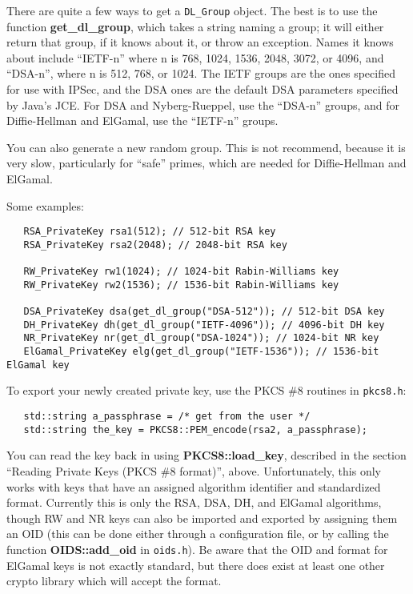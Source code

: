 \documentclass{article}
\newcommand{\filename}[1]{\texttt{#1}}
\newcommand{\function}[1]{\textbf{#1}}
\newcommand{\type}[1]{\texttt{#1}}
\begin{document}
There are quite a few ways to get a \type{DL\_Group} object. The best is to use
the function \function{get\_dl\_group}, which takes a string naming a group; it
will either return that group, if it knows about it, or throw an
exception. Names it knows about include ``IETF-n'' where n is 768, 1024, 1536,
2048, 3072, or 4096, and ``DSA-n'', where n is 512, 768, or 1024. The IETF
groups are the ones specified for use with IPSec, and the DSA ones are the
default DSA parameters specified by Java's JCE. For DSA and Nyberg-Rueppel, use
the ``DSA-n'' groups, and for Diffie-Hellman and ElGamal, use the ``IETF-n''
groups.

You can also generate a new random group. This is not recommend, because it is
very slow, particularly for ``safe'' primes, which are needed for
Diffie-Hellman and ElGamal.

Some examples:

\begin{verbatim}
   RSA_PrivateKey rsa1(512); // 512-bit RSA key
   RSA_PrivateKey rsa2(2048); // 2048-bit RSA key

   RW_PrivateKey rw1(1024); // 1024-bit Rabin-Williams key
   RW_PrivateKey rw2(1536); // 1536-bit Rabin-Williams key

   DSA_PrivateKey dsa(get_dl_group("DSA-512")); // 512-bit DSA key
   DH_PrivateKey dh(get_dl_group("IETF-4096")); // 4096-bit DH key
   NR_PrivateKey nr(get_dl_group("DSA-1024")); // 1024-bit NR key
   ElGamal_PrivateKey elg(get_dl_group("IETF-1536")); // 1536-bit ElGamal key
\end{verbatim}

To export your newly created private key, use the PKCS \#8 routines in
\filename{pkcs8.h}:

\begin{verbatim}
   std::string a_passphrase = /* get from the user */
   std::string the_key = PKCS8::PEM_encode(rsa2, a_passphrase);
\end{verbatim}

You can read the key back in using \function{PKCS8::load\_key}, described in
the section ``Reading Private Keys (PKCS \#8 format)'', above. Unfortunately,
this only works with keys that have an assigned algorithm identifier and
standardized format. Currently this is only the RSA, DSA, DH, and ElGamal
algorithms, though RW and NR keys can also be imported and exported by
assigning them an OID (this can be done either through a configuration file, or
by calling the function \function{OIDS::add\_oid} in \filename{oids.h}). Be
aware that the OID and format for ElGamal keys is not exactly standard, but
there does exist at least one other crypto library which will accept the
format.
\end{document}
